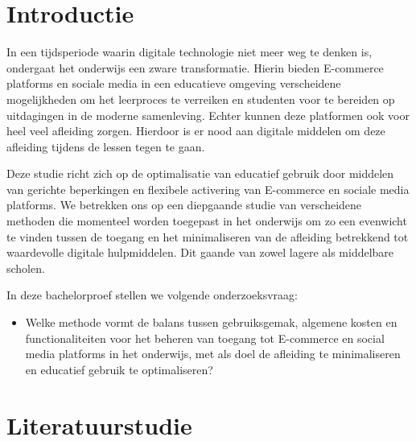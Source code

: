 
\section{Introductie}%
\label{sec:introductie}
In een tijdsperiode waarin digitale technologie niet meer weg te denken is, ondergaat het onderwijs een zware transformatie. Hierin bieden E-commerce platforms en sociale media in een educatieve omgeving verscheidene mogelijkheden om het leerproces te verreiken en studenten voor te bereiden op uitdagingen in de moderne samenleving. Echter kunnen deze platformen ook voor heel veel afleiding zorgen. Hierdoor is er nood aan digitale middelen om deze afleiding tijdens de lessen tegen te gaan. 

Deze studie richt zich op de optimalisatie van educatief gebruik door middelen van gerichte beperkingen en flexibele activering van E-commerce en sociale media platforms. We betrekken ons op een diepgaande studie van verscheidene methoden die momenteel worden toegepast in het onderwijs om zo een evenwicht te vinden tussen de toegang en het minimaliseren van de afleiding betrekkend tot waardevolle digitale hulpmiddelen. Dit gaande van zowel lagere als middelbare scholen. 

In deze bachelorproef stellen we volgende onderzoeksvraag:
\begin{itemize}
    \item Welke methode vormt de balans tussen gebruiksgemak, algemene kosten en functionaliteiten voor het beheren van toegang tot E-commerce en social media platforms in het onderwijs, met als doel de afleiding te minimaliseren en educatief gebruik te optimaliseren? 
\end{itemize}



\section{Literatuurstudie}%
\label{sec:state-of-the-art}

